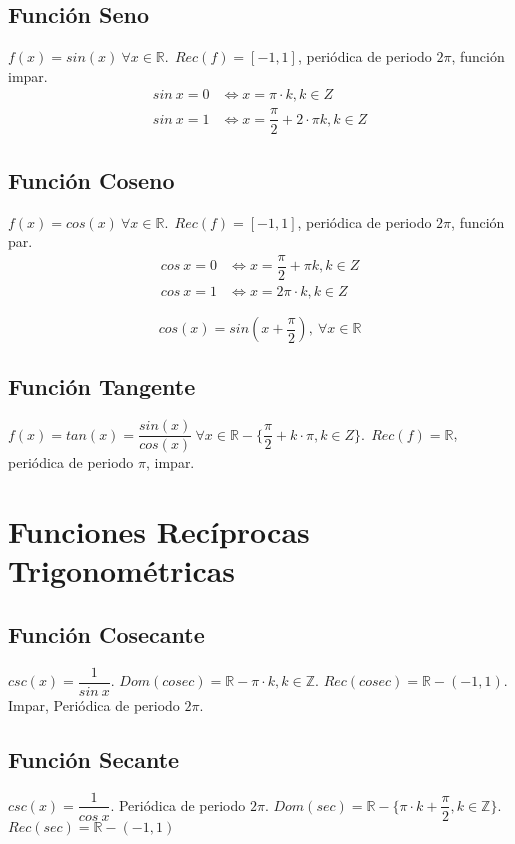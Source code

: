 \documentclass[11pt,a4paper]{article}
\begin{document}
\subsection{Funci\'on Seno}
$f(x) = sin(x)\ \forall x \in \mathbb{R}.\ \ Rec(f) = [-1,1]$, peri\'odica de periodo $2\pi$, funci\'on impar.
\begin{align*}
sin\ x = 0 &\iff x = \pi \cdot k, k \in Z\\
sin\ x = 1 &\iff x = \dfrac{\pi}{2} + 2 \cdot \pi k, k \in Z
\end{align*}
\subsection{Funci\'on Coseno}
$f(x) = cos(x)\ \forall x \in \mathbb{R}.\ \ Rec(f) = [-1,1]$, peri\'odica de periodo $2\pi$, funci\'on par.
\begin{align*}
cos\ x = 0 &\iff x = \dfrac{\pi}{2} + \pi k, k \in Z\\
cos\ x = 1 &\iff x = 2\pi \cdot k, k \in Z
\end{align*}

$$cos(x) = sin\left(x+\dfrac{\pi}{2}\right),\ \forall x \in \mathbb{R}$$
\subsection{Funci\'on Tangente}
$f(x) = tan(x) = \dfrac{sin(x)}{cos(x)}\ \forall x \in \mathbb{R}-\{\dfrac{\pi}{2}+k\cdot \pi, k \in Z\}.\ \ Rec(f) = \mathbb{R}$, peri\'odica de periodo $\pi$, impar.

\section{Funciones Rec\'iprocas Trigonom\'etricas}
\subsection{Funci\'on Cosecante}
$csc(x) = \dfrac{1}{sin\ x}$. $Dom(cosec) = \mathbb{R} - \pi \cdot k, k \in \mathbb{Z}$. $Rec(cosec) = \mathbb{R} - (-1,1)$. \\ 

Impar, Peri\'odica de periodo $2\pi$.

\subsection{Funci\'on Secante}
$csc(x) = \dfrac{1}{cos\ x}$. Peri\'odica de periodo $2\pi$. $Dom(sec) = \mathbb{R} - \{ \pi \cdot k + \dfrac{\pi}{2}, k \in \mathbb{Z}\}$. $Rec(sec) = \mathbb{R} - (-1,1)$\\
\end{document}

